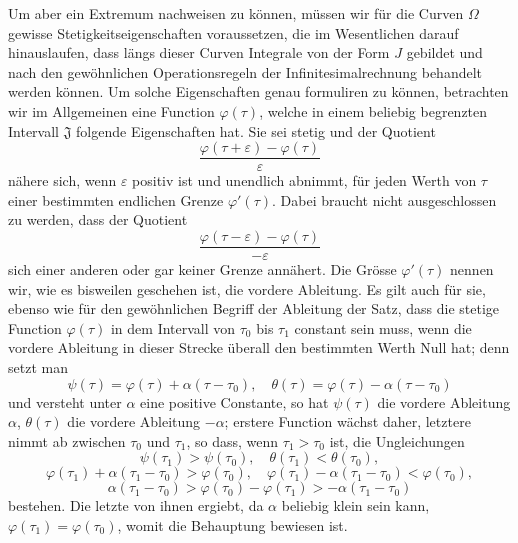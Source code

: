 \documentclass[11pt,a4paper,leqno]{article}
\begin{document}
Um aber ein Extremum nachweisen zu können, müssen wir für die Curven $\Omega$ gewisse Stetigkeitseigenschaften voraussetzen,
die im Wesentlichen darauf hinauslaufen, dass längs dieser Curven Integrale von der Form $J$ gebildet und nach den gewöhnlichen Operationsregeln der Infinitesimalrechnung behandelt werden können. Um solche Eigenschaften genau formuliren zu können, betrachten wir im Allgemeinen eine Function $\varphi(\tau)$, welche in einem beliebig begrenzten Intervall $\mathfrak{J}$ folgende Eigenschaften hat. Sie sei stetig und der Quotient
\[
\frac{\varphi(\tau+\varepsilon)-\varphi(\tau)}{\varepsilon}
\]
nähere sich, wenn $\varepsilon$ positiv ist und unendlich abnimmt, für jeden Werth von $\tau$ einer bestimmten endlichen Grenze $\varphi'(\tau)$. Dabei braucht nicht ausgeschlossen zu werden, dass der Quotient
\[
\frac{\varphi(\tau-\varepsilon)-\varphi(\tau)}{-\varepsilon}
\]
sich einer anderen oder gar keiner Grenze annähert. Die Grösse $\varphi'(\tau)$ nennen wir, wie es bisweilen geschehen ist, die vordere Ableitung. Es gilt auch für sie, ebenso wie für den gewöhnlichen Begriff der Ableitung der Satz, dass die stetige Function $\varphi(\tau)$ in dem Intervall von $\tau_0$ bis $\tau_1$ constant sein muss, wenn die vordere Ableitung in dieser Strecke überall den bestimmten Werth Null hat; denn setzt man
\[
\psi(\tau)=\varphi(\tau)+\alpha(\tau-\tau_0),
\quad \theta(\tau)=\varphi(\tau)-\alpha(\tau-\tau_0)
\]
und versteht unter $\alpha$ eine positive Constante, so hat $\psi(\tau)$ die vordere Ableitung $\alpha$, $\theta(\tau)$ die vordere Ableitung $-\alpha$; erstere Function wächst daher, letztere nimmt ab zwischen $\tau_0$ und $\tau_1$, so dass, wenn $\tau_1>\tau_0$ ist, die Ungleichungen
\[
\psi(\tau_1)>\psi(\tau_0),
\quad \theta(\tau_1)<\theta(\tau_0),
\]
\[
\varphi(\tau_1)+\alpha(\tau_1-\tau_0)>\varphi(\tau_0),
\quad \varphi(\tau_1)-\alpha(\tau_1-\tau_0)<\varphi(\tau_0),
\]
\[
\alpha(\tau_1-\tau_0)>\varphi(\tau_0)-\varphi(\tau_1)>-\alpha(\tau_1-\tau_0)
\]
bestehen. Die letzte von ihnen ergiebt, da $\alpha$ beliebig klein sein kann, $\varphi(\tau_1)=\varphi(\tau_0)$, womit die Behauptung bewiesen ist.
\end{document}
